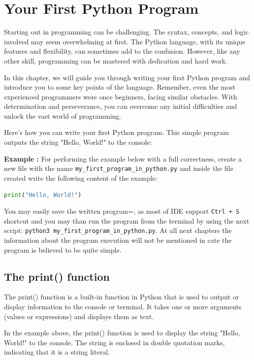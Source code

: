 \documentclass[12pt]{book}
\newtheorem{Example}{Example}[chapter]
\renewenvironment{Example}{\begin{trivlist}\item\relax
\textbf{Example \thesection: }}{\end{trivlist}}
\begin{document}
\chapter{Your First Python Program}

Starting out in programming can be challenging. The syntax, concepts, and logic involved may seem overwhelming at first. The Python language, with its unique features and flexibility, can sometimes add to the confusion. However, like any other skill, programming can be mastered with dedication and hard work.

In this chapter, we will guide you through writing your first Python program and introduce you to some key points of the language. Remember, even the most experienced programmers were once beginners, facing similar obstacles. With determination and perseverance, you can overcome any initial difficulties and unlock the vast world of programming.

Here's how you can write your first Python program. This simple program outputs the string "Hello, World!" to the console:
\begin{Example}
For performing the example below with a full correctness, create a new file with the name \texttt{my\_first\_program\_in\_python.py} and inside the file created write the following content of the example: 
\begin{lstlisting}[language=Python]
print("Hello, World!")
\end{lstlisting}
\end{Example}

You may easily save the written program=, as most of IDE support \texttt{Ctrl + S} shortcut and you may than run the program from the terminal by using the next script: 
\texttt{python3 my\_first\_program\_in\_python.py}. At all next chapters the information about the program execution will not be mentioned in cate the program is believed to be quite simple.



\section{The print() function}
The print() function is a built-in function in Python that is used to output or display information to the console or terminal. It takes one or more arguments (values or expressions) and displays them as text.

In the example above, the print() function is used to display the string "Hello, World!" to the console. The string is enclosed in double quotation marks, indicating that it is a string literal.
\end{document}
